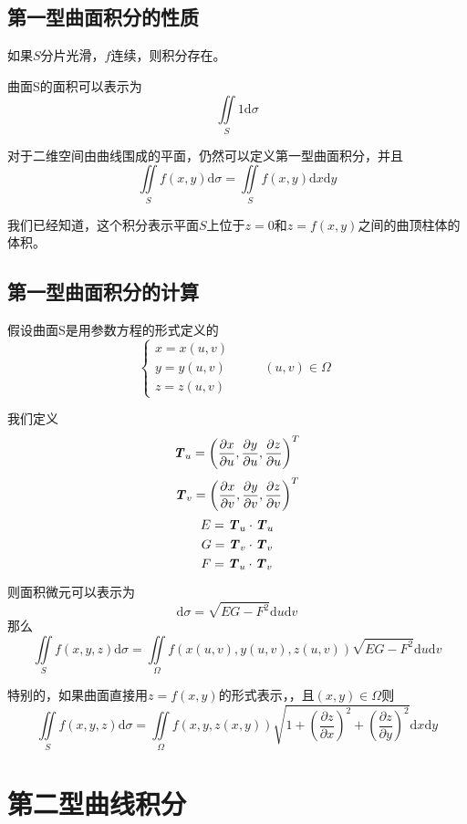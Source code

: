 \documentclass[UTF8,openany]{book}
\begin{document}
	\subsection{第一型曲面积分的性质}
	如果$S$分片光滑，$f$连续，则积分存在。\par
	曲面S的面积可以表示为
	$$\iint\limits_{S}1\mathrm{d}\sigma$$\par
	对于二维空间由曲线围成的平面，仍然可以定义第一型曲面积分，并且
	$$\iint\limits_{S}f(x,y)\mathrm{d}\sigma=\iint\limits_{S}f(x,y)\mathrm{d}x\mathrm{d}y$$\par
	我们已经知道，这个积分表示平面$S$上位于$z=0$和$z=f(x,y)$之间的曲顶柱体的体积。
	\subsection{第一型曲面积分的计算}
	假设曲面S是用参数方程的形式定义的\\
	$$\begin{cases}
	x=x(u,v)\\y=y(u,v)&\qquad(u,v)\in\Omega\\z=z(u,v)
	\end{cases}$$\par
	我们定义
	$$\textbf{\textit{T}}_{u}=\left(\frac{\partial x}{\partial u}, \frac{\partial y}{\partial u},
	\frac{\partial z}{\partial u}\right)^{T}$$
	$$\textbf{\textit{T}}_{v}=\left(\frac{\partial x}{\partial v}, \frac{\partial y}{\partial v},
	\frac{\partial z}{\partial v}\right)^{T}$$
	$$E=\textbf{\textit{T}}_{u}\cdot\textbf{\textit{T}}_{u}$$
	$$G=\textbf{\textit{T}}_{v}\cdot\textbf{\textit{T}}_{v}$$
	$$F=\textbf{\textit{T}}_{u}\cdot\textbf{\textit{T}}_{v}$$\par
	则面积微元可以表示为
	$$\mathrm{d}\sigma=\sqrt{EG-F^2}\mathrm{d}u\mathrm{d}v$$
	那么
	$$\iint\limits_{S}f(x,y,z)\mathrm{d}\sigma=
	\iint\limits_{\Omega}f\left(x(u,v),y(u,v),z(u,v)\right)\sqrt{EG-F^2}\mathrm{d}u\mathrm{d}v$$\par
	特别的，如果曲面直接用$z=f(x,y)$的形式表示，，且$(x,y)\in\Omega$则
	$$\iint\limits_{S}f(x,y,z)\mathrm{d}\sigma=
	\iint\limits_{\Omega}f\left(x,y,z(x,y)\right)\sqrt{1+\left(\frac{\partial z}{\partial x}\right)^2+
	\left(\frac{\partial z}{\partial y}\right)^2}\mathrm{d}x\mathrm{d}y$$
\section{第二型曲线积分}
\end{document}
